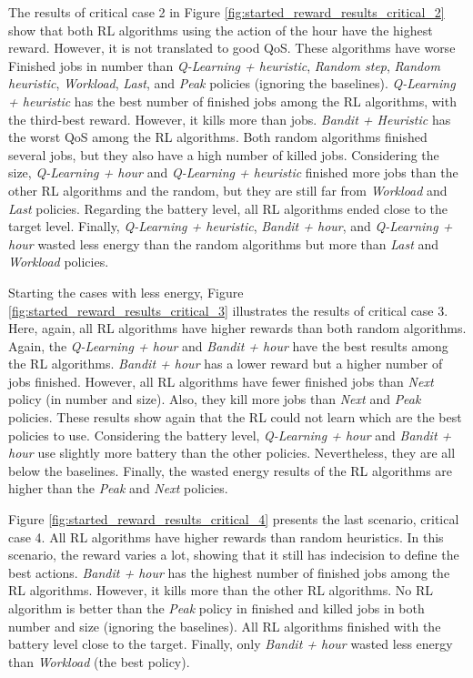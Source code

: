 The results of critical case 2 in Figure \ref{fig:started_reward_results_critical_2} show that both RL algorithms using the action of the hour have the highest reward. However, it is not translated to good QoS. These algorithms have worse Finished jobs in number than \emph{Q-Learning + heuristic}, \emph{Random step}, \emph{Random heuristic}, \emph{Workload}, \emph{Last}, and \emph{Peak} policies (ignoring the baselines). \emph{Q-Learning + heuristic} has the best number of finished jobs among the RL algorithms, with the third-best reward. However, it kills more than jobs. \emph{Bandit + Heuristic} has the worst QoS among the RL algorithms. Both random algorithms finished several jobs, but they also have a high number of killed jobs. Considering the size, \emph{Q-Learning + hour} and \emph{Q-Learning + heuristic} finished more jobs than the other RL algorithms and the random, but they are still far from \emph{Workload} and \emph{Last} policies. Regarding the battery level, all RL algorithms ended close to the target level. Finally, \emph{Q-Learning + heuristic}, \emph{Bandit + hour}, and \emph{Q-Learning + hour} wasted less energy than the random algorithms but more than \emph{Last} and \emph{Workload} policies.

Starting the cases with less energy, Figure \ref{fig:started_reward_results_critical_3} illustrates the results of critical case 3. Here, again, all RL algorithms have higher rewards than both random algorithms. Again, the \emph{Q-Learning + hour} and \emph{Bandit + hour} have the best results among the RL algorithms. \emph{Bandit + hour} has a lower reward but a higher number of jobs finished. However, all RL algorithms have fewer finished jobs than \emph{Next} policy (in number and size). Also, they kill more jobs than \emph{Next} and \emph{Peak} policies. These results show again that the RL could not learn which are the best policies to use. Considering the battery level, \emph{Q-Learning + hour} and \emph{Bandit + hour} use slightly more battery than the other policies. Nevertheless, they are all below the baselines. Finally, the wasted energy results of the RL algorithms are higher than the \emph{Peak} and \emph{Next} policies.

Figure \ref{fig:started_reward_results_critical_4} presents the last scenario, critical case 4. All RL algorithms have higher rewards than random heuristics. In this scenario, the reward varies a lot, showing that it still has indecision to define the best actions. \emph{Bandit + hour} has the highest number of finished jobs among the RL algorithms. However, it kills more than the other RL algorithms. No RL algorithm is better than the \emph{Peak} policy in finished and killed jobs in both number and size (ignoring the baselines). All RL algorithms finished with the battery level close to the target. Finally, only \emph{Bandit + hour} wasted less energy than \emph{Workload} (the best policy).

